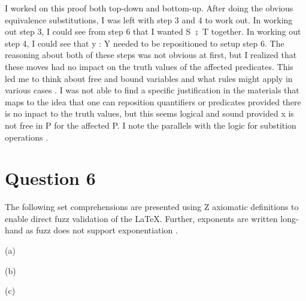 \documentclass[a4paper,10pt,fleqn]{article}
\begin{document}
\bigskip

\noindent I worked on this proof both top-down and bottom-up.  After doing the obvious equivalence substitutions, I was left with step 3 and 4 to work out. In working out step 3, I could see from step 6 that I wanted S $\semi$ T together.  In working out step 4, I could see that y : Y needed to be repositioned to setup step 6.  The reasoning about both of these steps was not obvious at first, but I realized that these moves had no impact on the truth values of the affected predicates.  This led me to think about free and bound variables and what rules might apply in various cases \citep[Pages 54-55]{simpson-notes}.  I was not able to find a specific justification in the materials that maps to the idea that one can reposition quantifiers or predicates provided there is no inpact to the truth values, but this seems logical and sound provided x is not free in P for the affected P. I note the parallels with the logic for substition operations \citep[Pages 56-57]{simpson-notes}.

\bigskip

\section*{Question 6}

\noindent The following set comprehensions are presented using Z axiomatic definitions to enable direct fuzz validation of the LaTeX.  Further, exponents are written long-hand as fuzz does not support exponentiation \citep{spivey1993fuzz}.

\bigskip

\noindent\hspace*{\parindent}(a) 

\medskip

\noindent\hspace*{\parindent}(b) 

\medskip

\noindent\hspace*{\parindent}(c) 
\end{document}

